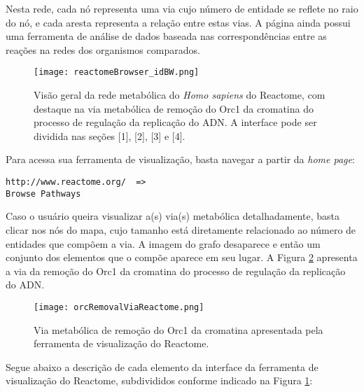 \indent Nesta rede, cada nó representa uma via cujo número de entidade se reflete no raio do nó, e cada aresta representa a relação entre estas vias. A página ainda possui uma ferramenta de análise de dados baseada nas correspondências entre as reações na redes dos organismos comparados.

\begin{figure}[!h]
\centering
\texttt{[image: reactomeBrowser\_idBW.png]}
\caption{Visão geral da rede metabólica do \textit{Homo sapiens} do Reactome, com destaque na via metabólica de remoção do Orc1 da cromatina do processo de regulação da replicação do ADN. A interface pode ser dividida nas seções [1], [2], [3] e [4].}
\label{reactomeBrowser_id}
\end{figure}

\indent Para acessa sua ferramenta de visualização, basta navegar a partir da \textit{home page}: \\

\begin{lstlisting}[frame=single] 
http://www.reactome.org/  =>
Browse Pathways
\end{lstlisting}

\indent Caso o usuário queira visualizar a(s) via(s) metabólica detalhadamente, basta clicar nos nós do mapa, cujo tamanho está diretamente relacionado ao número de entidades que compõem a via. A imagem do grafo desaparece e então um conjunto dos elementos que o compõe aparece em seu lugar. A Figura \ref{orcRemovalViaReactome} apresenta a via da remoção do Orc1 da cromatina do processo de regulação da replicação do ADN.

\begin{figure}[!h]
\centering
\texttt{[image: orcRemovalViaReactome.png]}
\caption{Via metabólica de remoção do Orc1 da cromatina apresentada pela ferramenta de visualização do Reactome.}
\label{orcRemovalViaReactome}
\end{figure}

\indent Segue abaixo a descrição de cada elemento da interface da ferramenta de visualização do Reactome, subdivididos  conforme indicado na Figura \ref{reactomeBrowser_id}:

